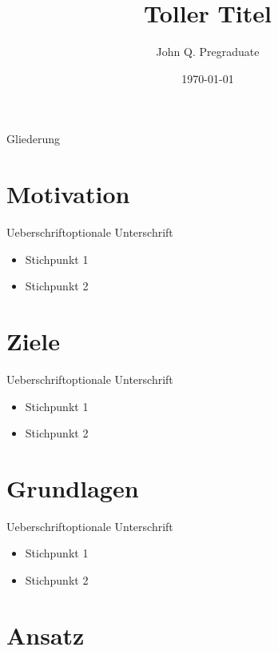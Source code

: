 \documentclass[11pt]{beamer}
\title{Toller Titel}
\author{John Q. Pregraduate}
\date{\today}
\begin{document}
	
	\begin{frame}{Gliederung}{}
		\tableofcontents[hideallsubsections]
	\end{frame}
	
	\section{Motivation}
	
	\begin{frame}{Ueberschrift}{optionale Unterschrift}
		\begin{itemize}
			\item Stichpunkt 1
			\item Stichpunkt 2
		\end{itemize}
	\end{frame}
	
	\section{Ziele}
	
	\begin{frame}{Ueberschrift}{optionale Unterschrift}
		\begin{itemize}
			\item Stichpunkt 1
			\item Stichpunkt 2
		\end{itemize}
	\end{frame}
	
	\section{Grundlagen}
	
	\begin{frame}{Ueberschrift}{optionale Unterschrift}
		\begin{itemize}
			\item Stichpunkt 1
			\item Stichpunkt 2
		\end{itemize}
	\end{frame}
	
	\section{Ansatz}
	
\end{document}
